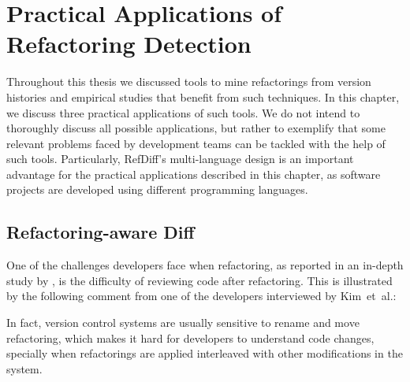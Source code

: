 \chapter{Practical Applications of Refactoring Detection}
\label{ChPracticalApplications}

Throughout this thesis we discussed tools to mine refactorings from version histories and empirical studies that benefit from such techniques. In this chapter, we discuss three practical applications of such tools.
We do not intend to thoroughly discuss all possible applications, but rather to exemplify that some relevant problems faced by development teams can be tackled with the help of such tools.
Particularly, RefDiff's multi-language design is an important advantage for the practical applications described in this chapter, as software projects are developed using different programming languages.


\section{Refactoring-aware Diff}
\label{SecRefactoringDiff}


One of the challenges developers face when refactoring, as reported in an in-depth study by \cite{kim-tse-2014}, is the difficulty of reviewing code after refactoring.
This is illustrated by the following comment from one of the developers interviewed by Kim~et~al.:\margin

\margin

In fact, version control systems are usually sensitive to rename and move refactoring,
which makes it hard for developers to understand code changes, specially when refactorings are applied interleaved with other modifications in the system.


